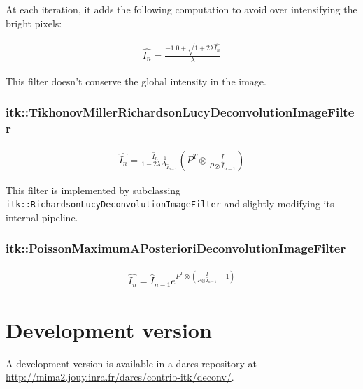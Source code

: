 \documentclass{InsightArticle}
\begin{document}
At each iteration, it adds the following computation to avoid over intensifying the bright pixels:

\begin{eqnarray}
\label{eq:imageFormation}
\hat{I_n} = \frac{- 1.0 + \sqrt{ 1 + 2 \lambda \hat{I_n} } }{\lambda}
\end{eqnarray}

This filter doesn't conserve the global intensity in the image.

\subsubsection{itk::TikhonovMillerRichardsonLucyDeconvolutionImageFilter}


\begin{eqnarray}
\label{eq:imageFormation}
\hat{I_n} = \frac{\hat{I}_{n-1}}{1-2\lambda\Delta_{\hat{I}_{n-1}}} \left(  P^T \otimes \frac{I}{ P \otimes \hat{I}_{n-1}} \right)
\end{eqnarray}

This filter is implemented by subclassing \verb$itk::RichardsonLucyDeconvolutionImageFilter$ and slightly
modifying its internal pipeline.

\subsubsection{itk::PoissonMaximumAPosterioriDeconvolutionImageFilter}

\begin{eqnarray}
\label{eq:imageFormation}
\hat{I_n} = \hat{I}_{n-1} e^{P^T \otimes \left(\frac{I}{ P \otimes \hat{I}_{n-1}}-1\right)}
\end{eqnarray}

% 

\section{Development version}

A development version is available in a darcs repository at
\url{http://mima2.jouy.inra.fr/darcs/contrib-itk/deconv/}.

\end{document}
